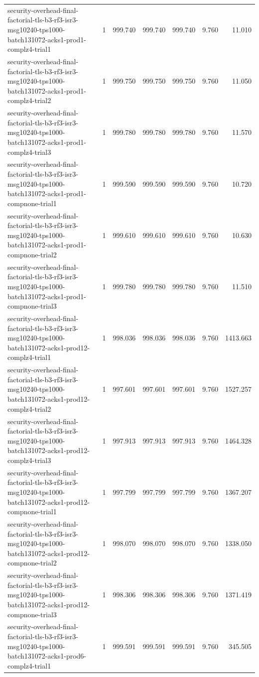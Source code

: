 \begin{tabular}{lrrrrrr}
security-overhead-final-factorial-tls-b3-rf3-isr3-msg10240-tps1000-batch131072-acks1-prod1-complz4-trial1 & 1 & 999.740 & 999.740 & 999.740 & 9.760 & 11.010 \\
security-overhead-final-factorial-tls-b3-rf3-isr3-msg10240-tps1000-batch131072-acks1-prod1-complz4-trial2 & 1 & 999.750 & 999.750 & 999.750 & 9.760 & 11.050 \\
security-overhead-final-factorial-tls-b3-rf3-isr3-msg10240-tps1000-batch131072-acks1-prod1-complz4-trial3 & 1 & 999.780 & 999.780 & 999.780 & 9.760 & 11.570 \\
security-overhead-final-factorial-tls-b3-rf3-isr3-msg10240-tps1000-batch131072-acks1-prod1-compnone-trial1 & 1 & 999.590 & 999.590 & 999.590 & 9.760 & 10.720 \\
security-overhead-final-factorial-tls-b3-rf3-isr3-msg10240-tps1000-batch131072-acks1-prod1-compnone-trial2 & 1 & 999.610 & 999.610 & 999.610 & 9.760 & 10.630 \\
security-overhead-final-factorial-tls-b3-rf3-isr3-msg10240-tps1000-batch131072-acks1-prod1-compnone-trial3 & 1 & 999.780 & 999.780 & 999.780 & 9.760 & 11.510 \\
security-overhead-final-factorial-tls-b3-rf3-isr3-msg10240-tps1000-batch131072-acks1-prod12-complz4-trial1 & 1 & 998.036 & 998.036 & 998.036 & 9.760 & 1413.663 \\
security-overhead-final-factorial-tls-b3-rf3-isr3-msg10240-tps1000-batch131072-acks1-prod12-complz4-trial2 & 1 & 997.601 & 997.601 & 997.601 & 9.760 & 1527.257 \\
security-overhead-final-factorial-tls-b3-rf3-isr3-msg10240-tps1000-batch131072-acks1-prod12-complz4-trial3 & 1 & 997.913 & 997.913 & 997.913 & 9.760 & 1464.328 \\
security-overhead-final-factorial-tls-b3-rf3-isr3-msg10240-tps1000-batch131072-acks1-prod12-compnone-trial1 & 1 & 997.799 & 997.799 & 997.799 & 9.760 & 1367.207 \\
security-overhead-final-factorial-tls-b3-rf3-isr3-msg10240-tps1000-batch131072-acks1-prod12-compnone-trial2 & 1 & 998.070 & 998.070 & 998.070 & 9.760 & 1338.050 \\
security-overhead-final-factorial-tls-b3-rf3-isr3-msg10240-tps1000-batch131072-acks1-prod12-compnone-trial3 & 1 & 998.306 & 998.306 & 998.306 & 9.760 & 1371.419 \\
security-overhead-final-factorial-tls-b3-rf3-isr3-msg10240-tps1000-batch131072-acks1-prod6-complz4-trial1 & 1 & 999.591 & 999.591 & 999.591 & 9.760 & 345.505 \\

\end{tabular}
